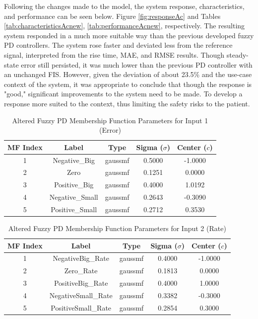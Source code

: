 \documentclass[12pt]{article}
\begin{document}
Following the changes made to the model, the system response, characteristics, and performance can be seen below. 
Figure \ref{fig:responseAc} and Tables \ref{tab:characteristicsAcnew}, \ref{tab:performanceAcnew}, respectively.
The resulting system responded in a much more suitable way than the previous developed fuzzy PD controllers.
The system rose faster and deviated less from the reference signal, interpreted from the rise time, MAE, and RMSE results.
Though steady-state error still persisted, it was much lower than the previous PD controller with an unchanged FIS. 
However, given the deviation of about 23.5\% and the use-case context of the system, it was appropriate to conclude that though the response is "good," significant improvements to the system need to be made.
To develop a response more suited to the context, thus limiting the safety risks to the patient.
\\

\begin{table}[H]
\centering
\begin{tabular}{|c|c|c|c|c|}
\hline
\textbf{MF Index} & \textbf{Label} & \textbf{Type} & \textbf{Sigma ($\sigma$)} & \textbf{Center ($c$)} \\ \hline
1 & Negative\_Big & gaussmf & 0.5000 & -1.0000 \\ \hline
2 & Zero & gaussmf & 0.1251 & 0.0000 \\ \hline
3 & Positive\_Big & gaussmf & 0.4000 & 1.0192 \\ \hline
4 & Negative\_Small & gaussmf & 0.2643 & -0.3090 \\ \hline
5 & Positive\_Small & gaussmf & 0.2712 & 0.3530 \\ \hline
\end{tabular}
\caption{Altered Fuzzy PD Membership Function Parameters for Input 1 (Error)}
\label{tab:errorAc}
\end{table}

\begin{table}[H]
\centering
\begin{tabular}{|c|c|c|c|c|}
\hline
\textbf{MF Index} & \textbf{Label} & \textbf{Type} & \textbf{Sigma ($\sigma$)} & \textbf{Center ($c$)} \\ \hline
1 & NegativeBig\_Rate & gaussmf & 0.4000 & -1.0000 \\ \hline
2 & Zero\_Rate & gaussmf & 0.1813 & 0.0000 \\ \hline
3 & PositiveBig\_Rate & gaussmf & 0.4000 & 1.0000 \\ \hline
4 & NegativeSmall\_Rate & gaussmf & 0.3382 & -0.3000 \\ \hline
5 & PositiveSmall\_Rate & gaussmf & 0.2854 & 0.3000 \\ \hline
\end{tabular}
\caption{Altered Fuzzy PD Membership Function Parameters for Input 2 (Rate)}
\label{tab:rateAc}
\end{table}
\end{document}
